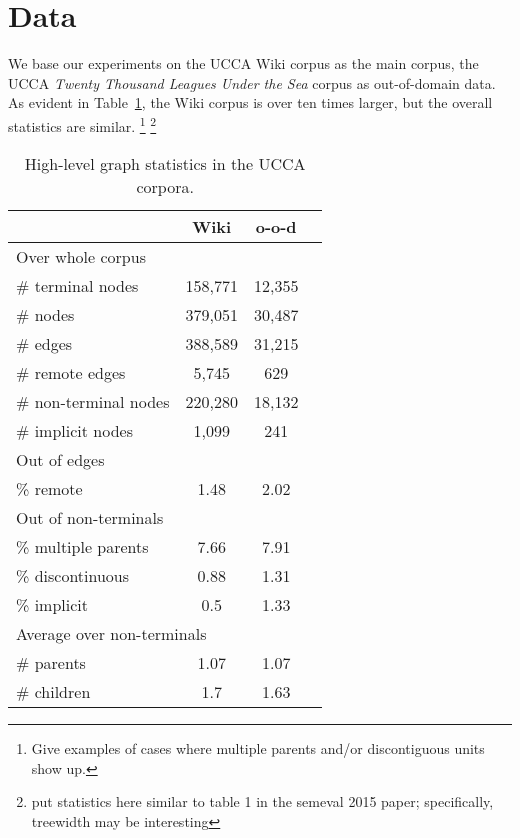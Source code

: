 \documentclass[11pt]{article}
\newcommand{\oa}[1]{\footnote{\color{red} #1}}
\newcommand{\tabref}[1]{Table~\ref{#1}}
\begin{document}
\section{Data}\label{sec:data}

We base our experiments on the UCCA Wiki corpus as the main corpus, the UCCA \textit{Twenty Thousand Leagues Under the Sea} corpus as out-of-domain data. As evident in \tabref{table:data}, the Wiki corpus is over ten times larger, but the overall statistics are similar.
\oa{Give examples of cases where multiple parents and/or discontiguous units show up.}
\oa{put statistics here similar to table 1 in the semeval 2015 paper; specifically, treewidth may be interesting}

\begin{table}
\begin{tabular}{l|ccc}
& Wiki & o-o-d \\
\hline
\multicolumn{3}{l}{\footnotesize Over whole corpus} \\
\# terminal nodes & 158,771 & 12,355 \\
\# nodes & 379,051 & 30,487 \\
\# edges & 388,589 & 31,215 \\
\# remote edges & 5,745 & 629 \\
\# non-terminal nodes & 220,280 & 18,132 \\
\# implicit nodes & 1,099 & 241 \\
\multicolumn{3}{l}{\footnotesize Out of edges} \\
\% remote & 1.48 & 2.02 \\
\multicolumn{3}{l}{\footnotesize Out of non-terminals} \\
\% multiple parents & 7.66 & 7.91 \\
\% discontinuous & 0.88 & 1.31 \\
\% implicit & 0.5 & 1.33 \\
\multicolumn{3}{l}{\footnotesize Average over non-terminals} \\
\# parents & 1.07 & 1.07 \\
\# children & 1.7 & 1.63 \\
\end{tabular}
\caption{High-level graph statistics in the UCCA corpora.}
\label{table:data}
\end{table}

\end{document}
